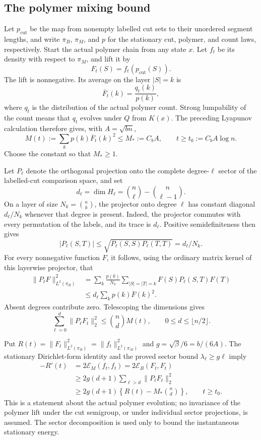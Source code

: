 \subsection{The polymer mixing bound}


Let $p_{\mathrm{cut}}$ be the map from nonempty labelled cut sets to their
unordered segment lengths, and write $\pi_B$, $\pi_M$, and $p$ for the
stationary cut, polymer, and count laws, respectively. Start the actual
polymer chain from any state $x$. Let $f_t$ be its density with respect to
$\pi_M$, and lift it by
\[
 F_t(S)=f_t(p_{\mathrm{cut}}(S)).
\]
The lift is nonnegative. Its average on the layer $|S|=k$ is
\[
 \overline F_t(k)=\frac{q_t(k)}{p(k)},
\]
where $q_t$ is the distribution of the actual polymer count. Strong
lumpability of the count means that $q_t$ evolves under $Q$ from $K(x)$.
The preceding Lyapunov calculation therefore gives, with $A=\sqrt{bn}$,
\begin{equation}\label{eq:polymer-count-warm-new}
 M(t):=\sum_kp(k)\overline F_t(k)^2\leq M_*:=C_bA,
 \qquad t\geq t_0:=C_bA\log n.
\end{equation}
Choose the constant so that $M_*\geq1$.

Let $P_\ell$ denote the orthogonal projection onto the complete
degree-$\ell$ sector of the labelled-cut comparison space, and set
\[
 d_\ell=\dim H_\ell=\binom n\ell-\binom n{\ell-1}.
\]
On a layer of size $N_k=\binom nk$, the projector onto degree $\ell$
has constant diagonal $d_\ell/N_k$ whenever that degree is present.
Indeed, the projector commutes with every permutation of the labels,
and its trace is $d_\ell$. Positive semidefiniteness then gives
\[
 |P_\ell(S,T)|\leq\sqrt{P_\ell(S,S)P_\ell(T,T)}=d_\ell/N_k.
\]
For every nonnegative function $F$, it follows, using the ordinary matrix
kernel of this layerwise projector, that
\begin{align*}
 \|P_\ell F\|_{L^2(\pi_B)}^2
 &=\sum_k\frac{p(k)}{N_k}
       \sum_{|S|=|T|=k}F(S)P_\ell(S,T)F(T)\\
 &\leq d_\ell\sum_kp(k)\overline F(k)^2.
\end{align*}
Absent degrees contribute zero. Telescoping the dimensions gives
\begin{equation}\label{eq:positive-low-degree-new}
 \sum_{\ell=0}^{d}\|P_\ell F_t\|_2^2
 \leq\binom nd M(t),\qquad 0\leq d\leq\lfloor n/2\rfloor.
\end{equation}

Put $R(t)=\|F_t\|_{L^2(\pi_B)}^2=\|f_t\|_{L^2(\pi_M)}^2$ and
$g=\sqrt\beta/6=b/(6A)$. The stationary Dirichlet-form identity and
the proved sector bound $\lambda_\ell\geq g\ell$ imply
\begin{align*}
 -R'(t)
 &=2\mathcal E_M(f_t,f_t)=2\mathcal E_B(F_t,F_t)\\
 &\geq2g(d+1)\sum_{\ell>d}\|P_\ell F_t\|_2^2\\
 &\geq2g(d+1)\left\{R(t)-M_*\binom nd\right\},
 \qquad t\geq t_0.
\end{align*}
This is a statement about the actual polymer evolution; no invariance of
the polymer lift under the cut semigroup, or under individual sector
projections, is assumed. The sector decomposition is used only to bound
the instantaneous stationary energy.

